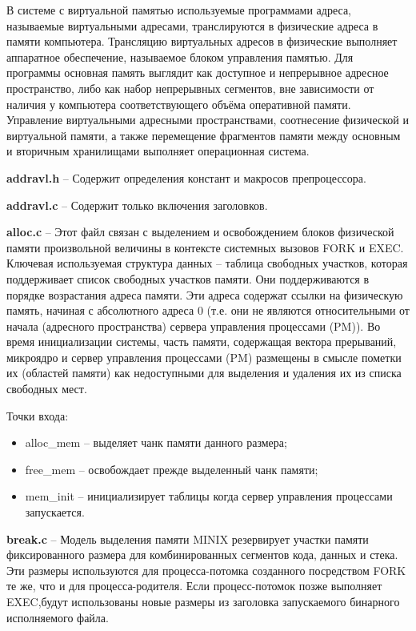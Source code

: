 В системе с виртуальной памятью используемые программами адреса, называемые виртуальными адресами, транслируются в физические адреса в памяти компьютера. Трансляцию виртуальных адресов в физические выполняет аппаратное обеспечение, называемое блоком управления памятью. Для программы основная память выглядит как доступное и непрерывное адресное пространство, либо как набор непрерывных сегментов, вне зависимости от наличия у компьютера соответствующего объёма оперативной памяти. Управление виртуальными адресными пространствами, соотнесение физической и виртуальной памяти, а также перемещение фрагментов памяти между основным и вторичным хранилищами выполняет операционная система.

\textbf{addravl.h} -- Содержит определения констант и макросов препроцессора.

\textbf{addravl.c} -- Содержит только включения заголовков.

\textbf{alloc.c} -- Этот файл связан с выделением и освобождением блоков физической памяти произвольной величины в контексте системных вызовов FORK и EXEC. Ключевая используемая структура данных -- таблица свободных участков, которая поддерживает список свободных участков памяти. Они поддерживаются в порядке возрастания адреса памяти. Эти адреса содержат ссылки на физическую память, начиная с абсолютного адреса 0 (т.е. они не являются относительными от начала (адресного пространства) сервера управления процессами (PM)). Во время инициализации системы, часть памяти, содержащая вектора прерываний, микроядро и сервер управления процессами (PM) размещены в смысле пометки их (областей памяти) как недоступными для выделения и удаления их из списка свободных мест.

Точки входа:
\begin{itemize}
\item alloc\_mem -- выделяет чанк памяти данного размера;
\item free\_mem -- освобождает прежде выделенный чанк памяти;
\item mem\_init -- инициализирует таблицы когда сервер управления процессами запускается.
\end{itemize}

\textbf{break.c} -- Модель выделения памяти MINIX резервирует участки памяти фиксированного размера для комбинированных сегментов кода, данных и стека. Эти размеры используются для процесса-потомка созданного посредством FORK те же, что и для процесса-родителя. Если процесс-потомок позже выполняет EXEC,будут использованы новые размеры из заголовка запускаемого бинарного исполняемого файла.

